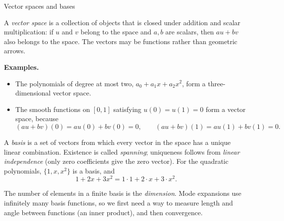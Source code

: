 \documentclass[11pt]{beamer}
\begin{document}
\begin{frame}[allowframebreaks=1.00]{Vector spaces and bases}
\footnotesize

A \emph{vector space} is a collection of objects that is closed under addition and
scalar multiplication: if $u$ and $v$ belong to the space and $a,b$ are scalars,
then $au+bv$ also belongs to the space.  The vectors may be functions rather than
geometric arrows.

\medskip
\textbf{Examples.}
\begin{itemize}
  \item The polynomials of degree at most two,
        $a_0+a_1x+a_2x^2$, form a three-dimensional vector space.
  \item The smooth functions on $[0,1]$ satisfying $u(0)=u(1)=0$ form a vector
        space, because
        \[
          (au+bv)(0)=au(0)+bv(0)=0,
          \qquad
          (au+bv)(1)=au(1)+bv(1)=0.
        \]
\end{itemize}

A \emph{basis} is a set of vectors from which every vector in the space has a
unique linear combination. Existence is called \emph{spanning}; uniqueness follows
from \emph{linear independence} (only zero coefficients give the zero vector).
For the quadratic
polynomials, $\{1,x,x^2\}$ is a basis, and
\begin{equation}
  1+2x+3x^2=1\cdot1+2\cdot x+3\cdot x^2.
  \label{eq:basis-mono}
\end{equation}

The number of elements in a finite basis is the \emph{dimension}.  Mode expansions
use infinitely many basis functions, so we first need a way to measure length and
angle between functions (an inner product), and then convergence.
\end{frame}
\end{document}
